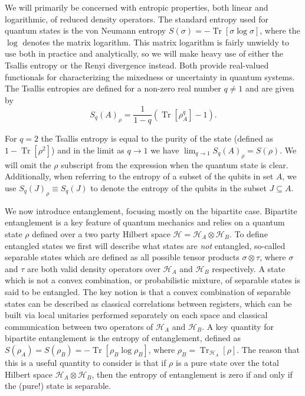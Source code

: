 \documentclass{article}
\DeclareMathOperator{\Tr}{Tr}
\newcommand{\brackets}[1]{\left[ #1 \right]}
\newcommand{\set}[1]{\left\{ #1 \right\}}
\newcommand{\trace}[1]{\Tr \brackets{ #1 }}
\newcommand{\partrace}[2]{\Tr_{#1} \brackets{ #2 }}
\newcommand{\hilb}{\mathcal{H}}
\begin{document}

We will primarily be concerned with entropic properties, both linear and logarithmic, of reduced density operators. The standard entropy used for quantum states is the von Neumann entropy $S(\sigma) = - \trace{\sigma \log \sigma}$, where the $\log$ denotes the matrix logarithm. This matrix logarithm is fairly unwieldy to use both in practice and analytically, so we will make heavy use of either the Tsallis entropy or the Renyi divergence instead. Both provide real-valued functionals for characterizing the mixedness or uncertainty in quantum systems. The Tsallis entropies are defined for a non-zero real number $q \neq 1$ and are given by
\begin{equation}
\label{eq:tsallis_entropy}
    S_{q}(A)_{\rho} = \frac{1}{1 - q} (\trace{\rho_A^q} - 1).
\end{equation}

For $q=2$ the Tsallis entropy is equal to the purity of the state (defined as $1 - \trace{\rho^2}$) and in the limit as $q \to 1$ we have $\lim_{q \to 1} S_q(A)_{\rho} = S(\rho)$. We will omit the $\rho$ subscript from the expression when the quantum state is clear. Additionally, when referring to the entropy of a subset of the qubits in set $A$, we use $S_q(J)_{\rho} \equiv S_q(J)$ to denote the entropy of the qubits in the subset $J \subseteq A$.

We now introduce entanglement, focusing mostly on the bipartite case. Bipartite entanglement is a key feature of quantum mechanics and relies on a quantum state $\rho$ defined over a two party Hilbert space $\hilb = \hilb_A \otimes \hilb_B$. To define entangled states we first will describe what states are \emph{not} entangled, so-called separable states which are defined as all possible tensor products $\sigma\otimes \tau$, where $\sigma$ and $\tau$ are both valid density operators over $\hilb_A$ and $\hilb_B$ respectively. A state which is not a convex combination, or probabilistic mixture, of separable states is said to be entangled. The key notion is that a convex combination of separable states can be described as classical correlations between registers, which can be built via local unitaries performed separately on each space and classical communication between two operators of $\hilb_A$ and $\hilb_B$. A key quantity for bipartite entanglement is the entropy of entanglement, defined as $S(\rho_A) = S(\rho_B) = -\trace{\rho_B \log \rho_B}$, where $\rho_B = \partrace{\hilb_A}{\rho}$. The reason that this is a useful quantity to consider is that if $\rho$ is a pure state over the total Hilbert space $\hilb_A \otimes \hilb_B$, then the entropy of entanglement is zero if and only if the (pure!) state is separable.
\end{document}
